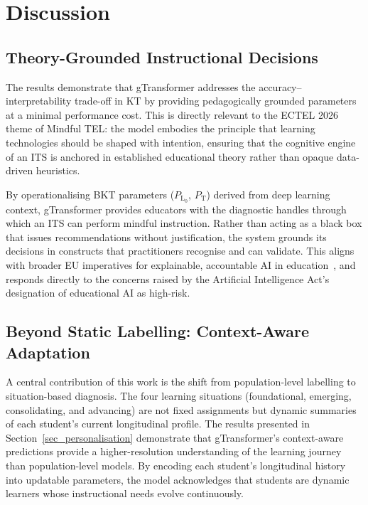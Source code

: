 \documentclass[runningheads]{llncs}
\begin{document}
%
\section{Discussion}

\subsection{Theory-Grounded Instructional Decisions}

The results demonstrate that gTransformer addresses the accuracy--interpretability trade-off in KT by providing pedagogically grounded parameters at a minimal performance cost. This is directly relevant to the ECTEL 2026 theme of Mindful TEL: the model embodies the principle that learning technologies should be shaped with intention, ensuring that the cognitive engine of an ITS is anchored in established educational theory rather than opaque data-driven heuristics.

By operationalising BKT parameters ($P_{\text{L}_0}$, $P_{\text{T}}$) derived from deep learning context, gTransformer provides educators with the diagnostic handles through which an ITS can perform mindful instruction. Rather than acting as a black box that issues recommendations without justification, the system grounds its decisions in constructs that practitioners recognise and can validate. This aligns with broader EU imperatives for explainable, accountable AI in education~\cite{Holmes2022504}, and responds directly to the concerns raised by the Artificial Intelligence Act's designation of educational AI as high-risk.

\subsection{Beyond Static Labelling: Context-Aware Adaptation}

A central contribution of this work is the shift from population-level labelling to situation-based diagnosis. The four learning situations (foundational, emerging, consolidating, and advancing) are not fixed assignments but dynamic summaries of each student's current longitudinal profile. The results presented in Section~\ref{sec_personalisation} demonstrate that gTransformer's context-aware predictions provide a higher-resolution understanding of the learning journey than population-level models. By encoding each student's longitudinal history into updatable parameters, the model acknowledges that students are dynamic learners whose instructional needs evolve continuously.
\end{document}
